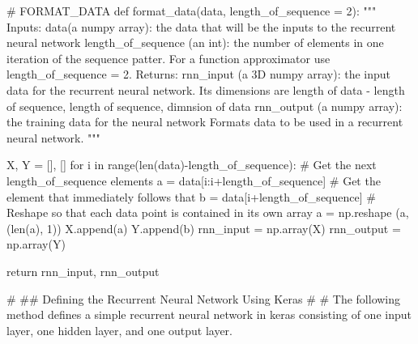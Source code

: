 \documentclass[%
oneside,                 %
final,                   %
10pt]{article}
\begin{document}
\bpycod
# FORMAT_DATA
def format_data(data, length_of_sequence = 2):  
    """
        Inputs:
            data(a numpy array): the data that will be the inputs to the recurrent neural
                network
            length_of_sequence (an int): the number of elements in one iteration of the
                sequence patter.  For a function approximator use length_of_sequence = 2.
        Returns:
            rnn_input (a 3D numpy array): the input data for the recurrent neural network.  Its
                dimensions are length of data - length of sequence, length of sequence, 
                dimnsion of data
            rnn_output (a numpy array): the training data for the neural network
        Formats data to be used in a recurrent neural network.
    """

    X, Y = [], []
    for i in range(len(data)-length_of_sequence):
        # Get the next length_of_sequence elements
        a = data[i:i+length_of_sequence]
        # Get the element that immediately follows that
        b = data[i+length_of_sequence]
        # Reshape so that each data point is contained in its own array
        a = np.reshape (a, (len(a), 1))
        X.append(a)
        Y.append(b)
    rnn_input = np.array(X)
    rnn_output = np.array(Y)

    return rnn_input, rnn_output


# ## Defining the Recurrent Neural Network Using Keras
# 
# The following method defines a simple recurrent neural network in keras consisting of one input layer, one hidden layer, and one output layer.
\end{document}
